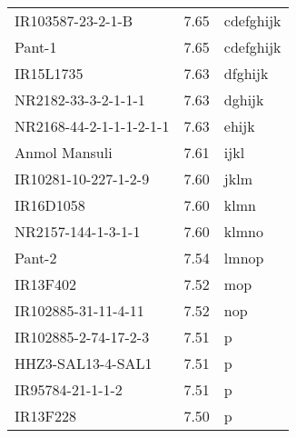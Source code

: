 \documentclass[]{article}
\begin{document}
\begin{longtable}{lll}
IR103587-23-2-1-B & 7.65 & cdefghijk\\
\rowcolor{gray!6}  Pant-1 & 7.65 & cdefghijk\\
IR15L1735 & 7.63 & dfghijk\\
\addlinespace
\rowcolor{gray!6}  NR2182-33-3-2-1-1-1 & 7.63 & dghijk\\
NR2168-44-2-1-1-1-2-1-1 & 7.63 & ehijk\\
\rowcolor{gray!6}  Anmol Mansuli & 7.61 & ijkl\\
IR10281-10-227-1-2-9 & 7.60 & jklm\\
\rowcolor{gray!6}  IR16D1058 & 7.60 & klmn\\
\addlinespace
NR2157-144-1-3-1-1 & 7.60 & klmno\\
\rowcolor{gray!6}  Pant-2 & 7.54 & lmnop\\
IR13F402 & 7.52 & mop\\
\rowcolor{gray!6}  IR102885-31-11-4-11 & 7.52 & nop\\
IR102885-2-74-17-2-3 & 7.51 & p\\
\addlinespace
\rowcolor{gray!6}  HHZ3-SAL13-4-SAL1 & 7.51 & p\\
IR95784-21-1-1-2 & 7.51 & p\\
\rowcolor{gray!6}  IR13F228 & 7.50 & p\\
\bottomrule
\end{longtable}
\endgroup{}
\begingroup\fontsize{12}{14}\selectfont
\end{document}
